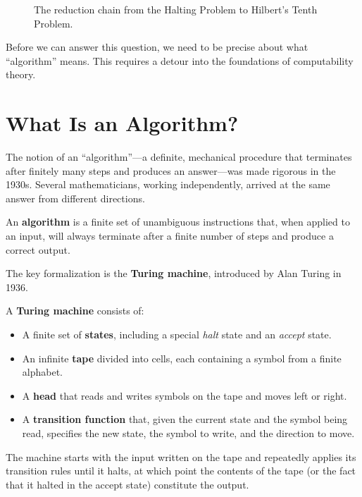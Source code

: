 \begin{figure}[htbp]
\centering
{}
\caption{The reduction chain from the Halting Problem to Hilbert's Tenth Problem.}
\label{fig:h10-reduction}
\end{figure}

Before we can answer this question, we need to be precise about what ``algorithm'' means. This requires a detour into the foundations of computability theory.

\section{What Is an Algorithm?}

The notion of an ``algorithm''---a definite, mechanical procedure that terminates after finitely many steps and produces an answer---was made rigorous in the 1930s. Several mathematicians, working independently, arrived at the same answer from different directions.

\begin{definition}[Informal]
An \textbf{algorithm} is a finite set of unambiguous instructions that, when applied to an input, will always terminate after a finite number of steps and produce a correct output.
\end{definition}

The key formalization is the \textbf{Turing machine}, introduced by Alan Turing in 1936.

\begin{definition}
A \textbf{Turing machine} consists of:
\begin{itemize}
    \item A finite set of \textbf{states}, including a special \emph{halt} state and an \emph{accept} state.
    \item An infinite \textbf{tape} divided into cells, each containing a symbol from a finite alphabet.
    \item A \textbf{head} that reads and writes symbols on the tape and moves left or right.
    \item A \textbf{transition function} that, given the current state and the symbol being read, specifies the new state, the symbol to write, and the direction to move.
\end{itemize}
The machine starts with the input written on the tape and repeatedly applies its transition rules until it halts, at which point the contents of the tape (or the fact that it halted in the accept state) constitute the output.
\end{definition}

